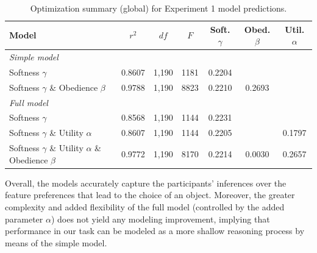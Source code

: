 \documentclass[11pt,a4paper]{article}
\begin{document}
\begin{table}[t]
\begin{tabular}{p{3.5cm}cccccc}
	\hline
	Model & $r^2$ & $df$ & $F$ & Soft. $\gamma$ & Obed. $\beta$ & Util. $\alpha$ \\
	\hline

	\hspace{1cm}\textit{Simple model} & & & & & \\
	
	Softness $\gamma$ & 0.8607 & 1,190 & 1181 & 0.2204 & & \\
	Softness $\gamma$ \& Obedience $\beta$ & 0.9788 & 1,190 & 8823 & 0.2210 & 0.2693 & \\
	
	\hspace{1cm}\textit{Full model} & & & & & \\

	Softness $\gamma$ & 0.8568 & 1,190 & 1144 & 0.2231 & & \\
	Softness $\gamma$ \& Utility $\alpha$ & 0.8607 & 1,190 & 1144 & 0.2205 &  & 0.1797\\
	Softness $\gamma$ \& Utility $\alpha$ \& Obedience $\beta$ & 0.9772 & 1,190 & 8170 & 0.2214 & 0.0030 & 0.2657\\
	\hline
\end{tabular}
\caption{Optimization summary (global) for Experiment 1 model predictions.}
\label{global}
\end{table}

Overall, the models accurately capture the participants' inferences over the feature preferences that lead to the choice of an object. %
Moreover, the greater complexity and added flexibility of the full model (controlled by the added parameter $\alpha$) does not yield any modeling improvement, implying that performance in our task can be modeled as a more shallow reasoning process by means of the simple model.

\end{document}
